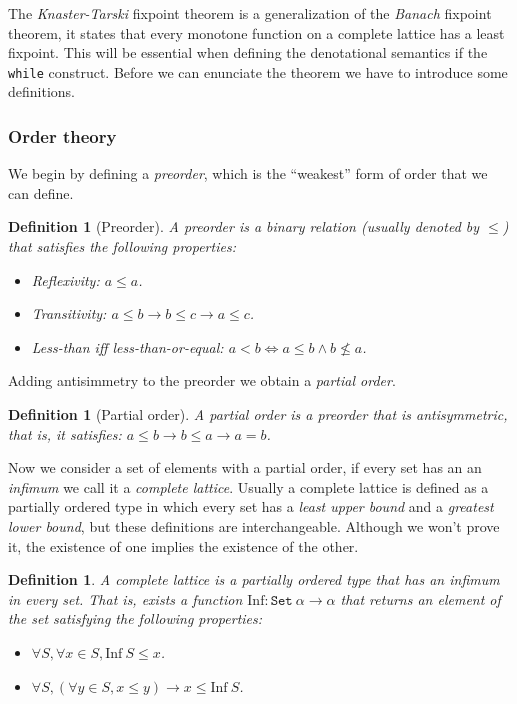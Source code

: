 \documentclass[
  a4paper, 
  10pt, 
  parskip=half, 
  DIV=20,
  toc=bibliography,
  usegeometry,
]{scrartcl}
\newtheorem{definition}[theorem]{Definition}
\newcommand{\funfont}[1]{\text{#1}}
\newcommand{\tyfont}[1]{\texttt{#1}}
\renewcommand{\implies}{\rightarrow}
\begin{document}
The \emph{Knaster-Tarski} fixpoint theorem is a generalization of the
\emph{Banach} fixpoint theorem, it states that every monotone function
on a complete lattice has a least fixpoint. This will be essential when defining
the denotational semantics if the \texttt{while} construct. Before
we can enunciate the theorem we have to introduce some definitions.

\subsubsection{Order theory}

We begin by defining a \emph{preorder}, which is the \enquote{weakest} form of
order that we can define.

\begin{definition}[Preorder]
  A preorder is a binary relation (usually denoted by \(\leq\)) that satisfies
  the following properties:
  \begin{itemize}
    \item Reflexivity: \(a \leq a\).
    \item Transitivity: \(a \leq b \to b \leq c \to a \leq c\).
    \item Less-than iff less-than-or-equal: \(a < b \iff a \leq b \land b \not\leq a\).
  \end{itemize}
\end{definition}

Adding antisimmetry to the preorder we obtain a \emph{partial order}.

\begin{definition}[Partial order]
  A partial order is a preorder that is antisymmetric, that is, it satisfies:
  \(a \leq b \to b \leq a \to a = b\).
\end{definition}

Now we consider a set of elements with a partial order, if every set has an
an \emph{infimum} we call it a \emph{complete lattice}. Usually a complete lattice 
is defined as a partially ordered type in which every set has a \emph{least upper bound}
and a \emph{greatest lower bound}, but these definitions are interchangeable.
Although we won't prove it, the existence of one implies the existence of the other.

\begin{definition}
  A complete lattice is a partially ordered type that has an infimum in every set. 
  That is, exists a function \(\funfont{Inf}: \tyfont{Set} \ \alpha \to \alpha\)
  that returns an element of the set satisfying the following properties:
  \begin{itemize}
    \item \(\forall S, \forall x \in S, \funfont{Inf} \ S \leq x\).
    \item \(\forall S, (\forall y \in S, x \leq y) \implies x \leq \funfont{Inf} \ S\).
  \end{itemize}
\end{definition}
\end{document}
